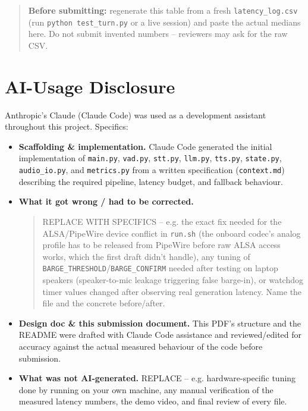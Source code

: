 \documentclass[11pt]{article}
\begin{document}
\begin{quote}\small
\color{red!70!black}
\textbf{Before submitting:} regenerate this table from a fresh \texttt{latency\_log.csv} (run
\texttt{python test\_turn.py} or a live session) and paste the actual medians here. Do not
submit invented numbers -- reviewers may ask for the raw CSV.
\end{quote}

\section{AI-Usage Disclosure}

Anthropic's Claude (Claude Code) was used as a development assistant throughout this project.
Specifics:

\begin{itemize}[leftmargin=4mm]
\item \textbf{Scaffolding \& implementation.} Claude Code generated the initial implementation
of \texttt{main.py}, \texttt{vad.py}, \texttt{stt.py}, \texttt{llm.py}, \texttt{tts.py},
\texttt{state.py}, \texttt{audio\_io.py}, and \texttt{metrics.py} from a written specification
(\texttt{context.md}) describing the required pipeline, latency budget, and fallback behaviour.
\item \textbf{What it got wrong / had to be corrected.}
\begin{quote}\small\color{blue!40!black}
REPLACE WITH SPECIFICS -- e.g. the exact fix needed for the ALSA/PipeWire device conflict in
\texttt{run.sh} (the onboard codec's analog profile has to be released from PipeWire before
raw ALSA access works, which the first draft didn't handle), any tuning of
\texttt{BARGE\_THRESHOLD}/\texttt{BARGE\_CONFIRM} needed after testing on laptop speakers
(speaker-to-mic leakage triggering false barge-in), or watchdog timer values changed after
observing real generation latency. Name the file and the concrete before/after.
\end{quote}
\item \textbf{Design doc \& this submission document.} This PDF's structure and the README were
drafted with Claude Code assistance and reviewed/edited for accuracy against the actual
measured behaviour of the code before submission.
\item \textbf{What was not AI-generated.} REPLACE -- e.g. hardware-specific tuning done by
running on your own machine, any manual verification of the measured latency numbers, the demo
video, and final review of every file.
\end{itemize}
\end{document}
